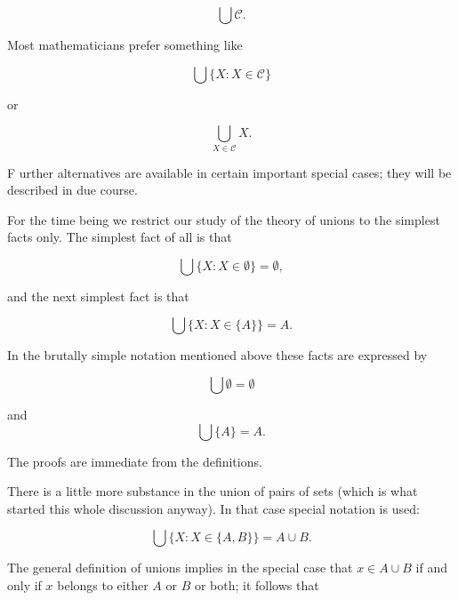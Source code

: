 \begin{equation*}
\bigcup \mathcal{C}.
\end{equation*}

Most mathematicians prefer something like 

\begin{equation*}
\bigcup \{ X: X \in \mathcal{C} \}
\end{equation*}

or

\begin{equation*}
\bigcup_{X \in \mathcal{C}} X.
\end{equation*}

F urther alternatives are available in certain important special cases; they will be described in due course.

For the time being we restrict our study of the theory of unions to the simplest facts only. The simplest fact of all is that

\begin{equation*}
\bigcup \{ X: X \in \emptyset \} = \emptyset ,
\end{equation*}

and the next simplest fact is that 

\begin{equation*}
\bigcup \{ X: X \in \{ A \} \} = A.
\end{equation*}

In the brutally simple notation mentioned above these facts are expressed by

\begin{equation*}
\bigcup \emptyset = \emptyset
\end{equation*}

and
\begin{equation*}
\bigcup \{ A \} = A.
\end{equation*}

The proofs are immediate from the definitions.

There is a little more substance in the union of pairs of sets (which is what started this whole discussion anyway). In that case special notation is used: 

\begin{equation*}
\bigcup \{ X: X \in \{A, B \} \} = A \cup B.
\end{equation*}

The general definition of unions implies in the special case that $x \in A \cup B$ if and only if $x$ belongs to either $A$ or $B$ or both; it follows that 

